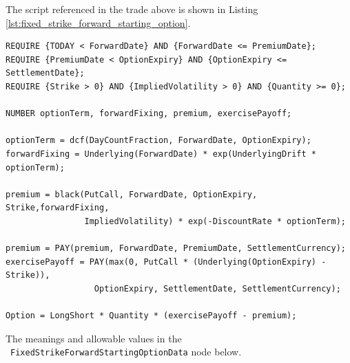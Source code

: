The script referenced in the trade above is shown in Listing \ref{lst:fixed_strike_forward_starting_option}.

\begin{listing}[hbt]
\begin{verbatim}
REQUIRE {TODAY < ForwardDate} AND {ForwardDate <= PremiumDate};
REQUIRE {PremiumDate < OptionExpiry} AND {OptionExpiry <= SettlementDate};
REQUIRE {Strike > 0} AND {ImpliedVolatility > 0} AND {Quantity >= 0};

NUMBER optionTerm, forwardFixing, premium, exercisePayoff;

optionTerm = dcf(DayCountFraction, ForwardDate, OptionExpiry);
forwardFixing = Underlying(ForwardDate) * exp(UnderlyingDrift * optionTerm);

premium = black(PutCall, ForwardDate, OptionExpiry, Strike,forwardFixing,
                ImpliedVolatility) * exp(-DiscountRate * optionTerm);

premium = PAY(premium, ForwardDate, PremiumDate, SettlementCurrency);
exercisePayoff = PAY(max(0, PutCall * (Underlying(OptionExpiry) - Strike)),
                  OptionExpiry, SettlementDate, SettlementCurrency);

Option = LongShort * Quantity * (exercisePayoff - premium);
\end{verbatim}
\caption{Payoff script for a Fixed Strike Forward Starting Option.}
\label{lst:fixed_strike_forward_starting_option}
\end{listing}

The meanings and allowable values in the \
\lstinline!FixedStrikeForwardStartingOptionData! node below.

